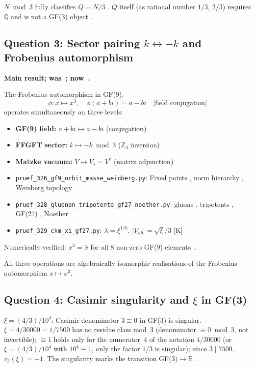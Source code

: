 \begin{keyresult}
$N\bmod 3$ fully classifies $Q=N/3$ \BM.
$Q$ itself (as rational number $1/3$, $2/3$) requires $\mathbb{Q}$
and is not a GF(3) object~\KM.
\end{keyresult}

\subsection{Question 3: Sector pairing $k\leftrightarrow-k$ and Frobenius automorphism}

\textbf{Main result; was~\SM; now~\BM.}

The Frobenius automorphism in GF(9):
\begin{equation}
  \phi: x\mapsto x^3,\quad \phi(a+bi)=a-bi \quad \text{[field conjugation]}
\end{equation}
operates simultaneously on three levels:
\begin{itemize}
  \item \textbf{GF(9) field:} $a+bi\mapsto a-bi$ (conjugation)
  \item \textbf{FFGFT sector:} $k\mapsto -k\bmod 3$ ($\mathbb{Z}_3$ inversion)
  \item \textbf{Matzke vacuum:} $V\mapsto V_s = V^\dagger$ (matrix adjunction)
  \item \texttt{pruef\_326\_gf9\_orbit\_masse\_weinberg.py}: Fixed points \BM, norm hierarchy \BM, Weinberg topology \KM
  \item \texttt{pruef\_328\_gluonen\_tripotente\_gf27\_noether.py}: gluons \BM, tripotents \BM, GF(27) \KM, Noether \BM
  \item \texttt{pruef\_329\_ckm\_xi\_gf27.py}: $\lambda=\xi^{1/6}$, $|V_{ub}|=\sqrt{\xi}/3$ [K]
\end{itemize}
Numerically verified: $x^3=\bar{x}$ for all 8 non-zero GF(9) elements~\BM.

\begin{keyresult}[Status~\BM]
All three operations are algebraically isomorphic realisations
of the Frobenius automorphism $x\mapsto x^3$.
\end{keyresult}

\subsection{Question 4: Casimir singularity and $\xi$ in GF(3)}

$\xi = (4/3)/10^4$: Casimir denominator $3\equiv 0$ in GF(3) is singular.
$\xi = 4/30000 = 1/7500$ has no residue class mod~3 (denominator $\equiv 0 \bmod 3$, not invertible);
$\equiv 1$ holds only for the numerator~4 of the notation $4/30000$ (or $\xi = (4/3)/10^4$ with $10^4 \equiv 1$, only the factor $1/3$ is singular);
since $3 \mid 7500$, $v_3(\xi) = -1$.
The singularity marks the transition GF(3)$\to\mathbb{R}$~\KM.

